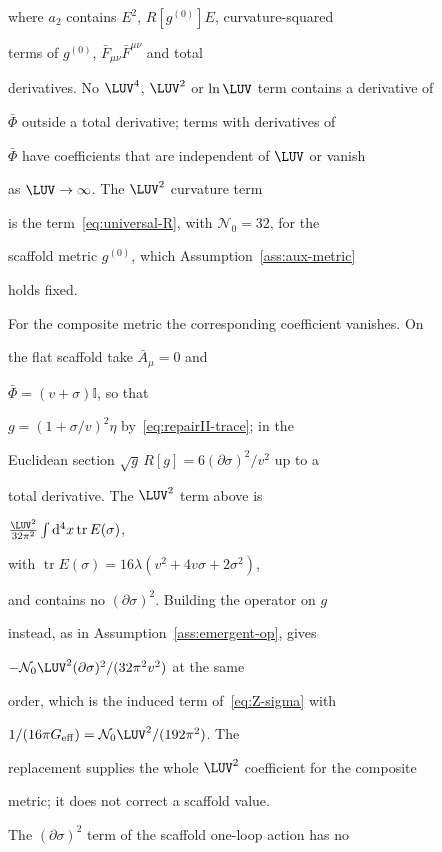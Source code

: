 where \(a_2\) contains \(E^2\), \(R[g^{(0)}]E\), curvature-squared

terms of \(g^{(0)}\), \(\bar F_{\mu\nu}\bar F^{\mu\nu}\) and total

derivatives. No \(\LUV^4\), \(\LUV^2\) or \(\ln\LUV\) term contains a derivative of

\(\bar\Phi\) outside a total derivative; terms with derivatives of

\(\bar\Phi\) have coefficients that are independent of \(\LUV\) or vanish

as \(\LUV\to\infty\). The \(\LUV^2\) curvature term

is the term~\eqref{eq:universal-R}, with \(\mathcal N_0=32\), for the

scaffold metric \(g^{(0)}\), which Assumption~\ref{ass:aux-metric}

holds fixed.



For the composite metric the corresponding coefficient vanishes. On

the flat scaffold take \(\bar A_\mu=0\) and

\(\bar\Phi=(v+\sigma)\mathbb I\), so that

\(g=(1+\sigma/v)^2\eta\) by~\eqref{eq:repairII-trace}; in the

Euclidean section \(\sqrt g\,R[g]=6(\partial\sigma)^2/v^2\) up to a

total derivative. The \(\LUV^2\) term above is

\(\tfrac{\LUV^2}{32\pi^2}\int\mathrm{d}^4x\operatorname{tr}E(\sigma)\),

with \(\operatorname{tr}E(\sigma)=16\lambda(v^2+4v\sigma+2\sigma^2)\),

and contains no \((\partial\sigma)^2\). Building the operator on \(g\)

instead, as in Assumption~\ref{ass:emergent-op}, gives

\(-\mathcal N_0\LUV^2(\partial\sigma)^2/(32\pi^2v^2)\) at the same

order, which is the induced term of~\eqref{eq:Z-sigma} with

\(1/(16\pi G_{\mathrm{eff}})=\mathcal N_0\LUV^2/(192\pi^2)\). The

replacement supplies the whole \(\LUV^2\) coefficient for the composite

metric; it does not correct a scaffold value.



The \((\partial\sigma)^2\) term of the scaffold one-loop action has no

